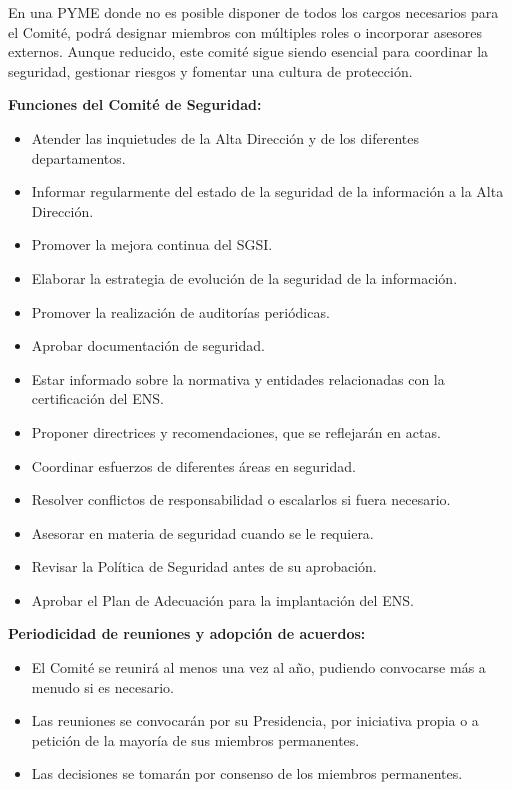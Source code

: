 \begin{enumerate}[label=\alph*)]
En una PYME donde no es posible disponer de todos los cargos necesarios para el Comité, \Beneficiario{} podrá designar miembros con múltiples roles o incorporar asesores externos. Aunque reducido, este comité sigue siendo esencial para coordinar la seguridad, gestionar riesgos y fomentar una cultura de protección.

\textbf{Funciones del Comité de Seguridad:}
\begin{itemize}
  \item Atender las inquietudes de la Alta Dirección y de los diferentes departamentos.
  \item Informar regularmente del estado de la seguridad de la información a la Alta Dirección.
  \item Promover la mejora continua del SGSI.
  \item Elaborar la estrategia de evolución de la seguridad de la información.
  \item Promover la realización de auditorías periódicas.
  \item Aprobar documentación de seguridad.
  \item Estar informado sobre la normativa y entidades relacionadas con la certificación del ENS.
  \item Proponer directrices y recomendaciones, que se reflejarán en actas.
  \item Coordinar esfuerzos de diferentes áreas en seguridad.
  \item Resolver conflictos de responsabilidad o escalarlos si fuera necesario.
  \item Asesorar en materia de seguridad cuando se le requiera.
  \item Revisar la Política de Seguridad antes de su aprobación.
  \item Aprobar el Plan de Adecuación para la implantación del ENS.
\end{itemize}

\textbf{Periodicidad de reuniones y adopción de acuerdos:}
\begin{itemize}
  \item El Comité se reunirá al menos una vez al año, pudiendo convocarse más a menudo si es necesario.
  \item Las reuniones se convocarán por su Presidencia, por iniciativa propia o a petición de la mayoría de sus miembros permanentes.
  \item Las decisiones se tomarán por consenso de los miembros permanentes.
\end{itemize}


\end{enumerate}
